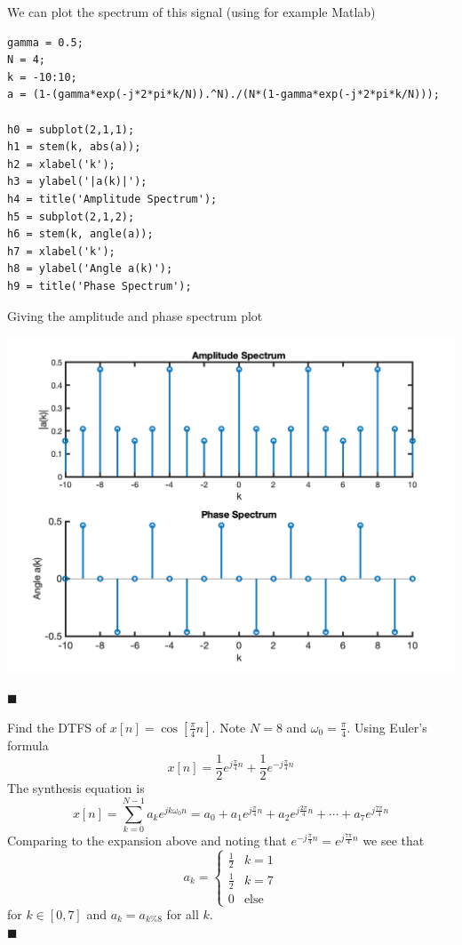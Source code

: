 \begin{example}
We can plot the spectrum of this signal (using for example Matlab)
\begin{verbatim}
gamma = 0.5;
N = 4;
k = -10:10;
a = (1-(gamma*exp(-j*2*pi*k/N)).^N)./(N*(1-gamma*exp(-j*2*pi*k/N)));

h0 = subplot(2,1,1);
h1 = stem(k, abs(a));
h2 = xlabel('k');
h3 = ylabel('|a(k)|');
h4 = title('Amplitude Spectrum');
h5 = subplot(2,1,2);
h6 = stem(k, angle(a));
h7 = xlabel('k');
h8 = ylabel('Angle a(k)');
h9 = title('Phase Spectrum');
\end{verbatim}
Giving the amplitude and phase spectrum plot
\begin{center}
\includegraphics[scale=0.7]{graphics/dtfs_example1.png}
\end{center}
$\blacksquare$
\end{example}

\begin{example}
  Find the DTFS of $x[n] = \cos[\tfrac{\pi}{4}n]$. Note $N=8$ and $\omega_0 = \tfrac{\pi}{4}$. Using Euler's formula
  \[
  x[n] = \frac{1}{2}e^{j\frac{\pi}{4}n} + \frac{1}{2}e^{-j\frac{\pi}{4}n}
  \]
  The synthesis equation is
  \[
  x[n] = \sum\limits_{k = 0}^{N-1} a_k e^{jk\omega_0n} = a_0 + a_1e^{j\frac{\pi}{4}n}+ a_2e^{j\frac{2\pi}{4}n} + \cdots + a_7e^{j\frac{7\pi}{4}n}  
  \]
  Comparing to the expansion above and noting that $e^{-j\frac{\pi}{4}n} = e^{j\frac{7\pi}{4}n}$ we see that
  \[
  a_k = \begin{cases}
    \frac{1}{2} & k=1\\
    \frac{1}{2} & k=7\\
    0 & \mbox{else}
  \end{cases}
  \]
  for $k \in [0,7]$ and $a_k = a_{k\%8}$ for all $k$.\\
  $\blacksquare$
\end{example}

